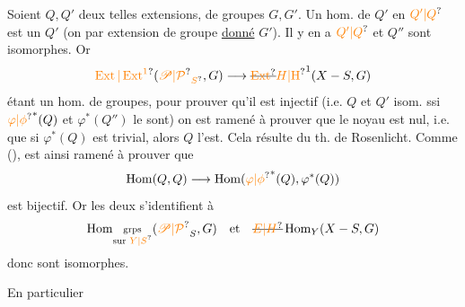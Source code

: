 Soient $Q,Q'$ deux telles extensions, de groupes $G,G'$. Un hom. de $Q'$ en ${\unsure{Q'|Q}}$ est  un{}     $Q'$  (on {} par extension de groupe \uline{donné} $G'$). Il y en a {} ${\unsure{Q'|Q}}$ et $Q''$ sont isomorphes. Or
\[
{\unsure{\operatorname{Ext}|\operatorname{Ext}^1}}({\unsure{\mathscr P|\mathcal P}}_{{\unsure{S}}},G)\longrightarrow\deleted{{\unsure{\operatorname{Ext}}}}{\unsure{H|\mathrm H}}^1(X-S,G)
\]
étant un hom. de groupes, pour prouver qu’il est injectif (i.e. $Q$ et $Q'$ isom. ssi ${\unsure{\varphi|\phi}}^*(Q)$ et $\varphi^*(Q'')$ le sont) on est ramené à prouver que le noyau est nul, i.e. que si $\varphi^*(Q)$ est trivial, alors $Q$ l’est. Cela résulte   du th. de Rosenlicht.
Comme  ({}),  {}
est ainsi ramené à prouver que
\[
\operatorname{Hom}(Q,Q)\longrightarrow\operatorname{Hom}({\unsure{\varphi|\phi}}^*(Q),\varphi^*(Q))
\]
est bijectif. Or les deux s’identifient {} à
\[
\operatorname{Hom}_{\substack{\text{grps}\\\text{sur }{\unsure{Y|S}}}}({\unsure{\mathscr P|\mathcal P}}_S,G)
\quad\text{et}\quad
\deleted{{\unsure{E|H}}}\operatorname{Hom}_Y(X-S,G)
\]
donc sont isomorphes.

En particulier

